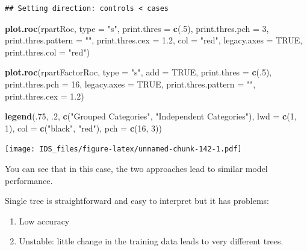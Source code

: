 \documentclass[12pt,]{krantz}
\makeatletter
\newenvironment{Shaded}{\begin{snugshade}}{\end{snugshade}}
\newcommand{\DataTypeTok}[1]{\textcolor[rgb]{0.27,0.27,0.27}{#1}}
\newcommand{\DecValTok}[1]{\textcolor[rgb]{0.06,0.06,0.06}{#1}}
\newcommand{\FloatTok}[1]{\textcolor[rgb]{0.06,0.06,0.06}{#1}}
\newcommand{\KeywordTok}[1]{\textcolor[rgb]{0.27,0.27,0.27}{\textbf{#1}}}
\newcommand{\NormalTok}[1]{#1}
\newcommand{\OtherTok}[1]{\textcolor[rgb]{0.37,0.37,0.37}{#1}}
\newcommand{\StringTok}[1]{\textcolor[rgb]{0.5,0.5,0.5}{#1}}
\providecommand{\tightlist}{%
  \setlength{\itemsep}{0pt}\setlength{\parskip}{0pt}}
\newenvironment{kframe}{%
\medskip{}
\setlength{\fboxsep}{.8em}
 \def\at@end@of@kframe{}%
 \ifinner\ifhmode%
  \def\at@end@of@kframe{\end{minipage}}%
  \begin{minipage}{\columnwidth}%
 \fi\fi%
 \def\FrameCommand##1{\hskip\@totalleftmargin \hskip-\fboxsep
 \colorbox{shadecolor}{##1}\hskip-\fboxsep
     \hskip-\linewidth \hskip-\@totalleftmargin \hskip\columnwidth}%
 \MakeFramed {\advance\hsize-\width
   \@totalleftmargin\z@ \linewidth\hsize
   \@setminipage}}%
 {\par\unskip\endMakeFramed%
 \at@end@of@kframe}
\renewenvironment{Shaded}{\begin{kframe}}{\end{kframe}}
\makeatother
\begin{document}
\begin{verbatim}
## Setting direction: controls < cases
\end{verbatim}

\begin{Shaded}
\begin{Highlighting}[]
\KeywordTok{plot.roc}\NormalTok{(rpartRoc, }
     \DataTypeTok{type =} \StringTok{"s"}\NormalTok{, }
     \DataTypeTok{print.thres =} \KeywordTok{c}\NormalTok{(.}\DecValTok{5}\NormalTok{),}
     \DataTypeTok{print.thres.pch =} \DecValTok{3}\NormalTok{,}
     \DataTypeTok{print.thres.pattern =} \StringTok{""}\NormalTok{,}
     \DataTypeTok{print.thres.cex =} \FloatTok{1.2}\NormalTok{,}
     \DataTypeTok{col =} \StringTok{"red"}\NormalTok{, }\DataTypeTok{legacy.axes =} \OtherTok{TRUE}\NormalTok{,}
     \DataTypeTok{print.thres.col =} \StringTok{"red"}\NormalTok{)}

\KeywordTok{plot.roc}\NormalTok{(rpartFactorRoc,}
     \DataTypeTok{type =} \StringTok{"s"}\NormalTok{,}
     \DataTypeTok{add =} \OtherTok{TRUE}\NormalTok{,}
     \DataTypeTok{print.thres =} \KeywordTok{c}\NormalTok{(.}\DecValTok{5}\NormalTok{),}
     \DataTypeTok{print.thres.pch =} \DecValTok{16}\NormalTok{, }\DataTypeTok{legacy.axes =} \OtherTok{TRUE}\NormalTok{,}
     \DataTypeTok{print.thres.pattern =} \StringTok{""}\NormalTok{,}
     \DataTypeTok{print.thres.cex =} \FloatTok{1.2}\NormalTok{)}

\KeywordTok{legend}\NormalTok{(.}\DecValTok{75}\NormalTok{, }\FloatTok{.2}\NormalTok{,}
       \KeywordTok{c}\NormalTok{(}\StringTok{"Grouped Categories"}\NormalTok{, }\StringTok{"Independent Categories"}\NormalTok{),}
       \DataTypeTok{lwd =} \KeywordTok{c}\NormalTok{(}\DecValTok{1}\NormalTok{, }\DecValTok{1}\NormalTok{),}
       \DataTypeTok{col =} \KeywordTok{c}\NormalTok{(}\StringTok{"black"}\NormalTok{, }\StringTok{"red"}\NormalTok{),}
       \DataTypeTok{pch =} \KeywordTok{c}\NormalTok{(}\DecValTok{16}\NormalTok{, }\DecValTok{3}\NormalTok{))}
\end{Highlighting}
\end{Shaded}

\texttt{[image: IDS\_files/figure-latex/unnamed-chunk-142-1.pdf]}

You can see that in this case, the two approaches lead to similar model performance.

Single tree is straightforward and easy to interpret but it has problems:

\begin{enumerate}
\def\labelenumi{\arabic{enumi}.}
\tightlist
\item
  Low accuracy
\item
  Unstable: little change in the training data leads to very different trees.
\end{enumerate}
\end{document}
